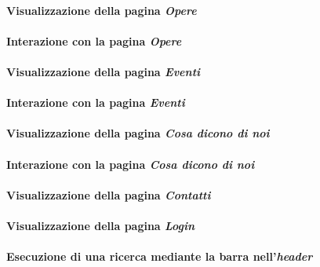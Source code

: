 \paragraph{Visualizzazione della pagina \textit{Opere}}
\label{analisi-casi-uso-attori-principali-utente-generico-3}

\paragraph{Interazione con la pagina \textit{Opere}}
\label{analisi-casi-uso-attori-principali-utente-generico-4}

\paragraph{Visualizzazione della pagina \textit{Eventi}}
\label{analisi-casi-uso-attori-principali-utente-generico-5}

\paragraph{Interazione con la pagina \textit{Eventi}}
\label{analisi-casi-uso-attori-principali-utente-generico-6}

\paragraph{Visualizzazione della pagina \textit{Cosa dicono di noi}}
\label{analisi-casi-uso-attori-principali-utente-generico-7}

\paragraph{Interazione con la pagina \textit{Cosa dicono di noi}}
\label{analisi-casi-uso-attori-principali-utente-generico-8}

\paragraph{Visualizzazione della pagina \textit{Contatti}}
\label{analisi-casi-uso-attori-principali-utente-generico-9}

\paragraph{Visualizzazione della pagina \textit{Login}}
\label{analisi-casi-uso-attori-principali-utente-generico-10}

\paragraph{Esecuzione di una ricerca mediante la barra nell'\textit{header}}
\label{analisi-casi-uso-attori-principali-utente-generico-11}

